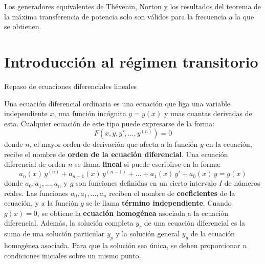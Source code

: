 \documentclass[11pt]{book} %
\makeatletter
\numberwithin{dummy}{section}
\theoremstyle{ocrenumbox}
\theoremstyle{blacknumex}
\theoremstyle{blacknumbox}
\theoremstyle{ocrenum}
\newenvironment{remark}{\par\vspace{10pt}\small %
\begin{list}{}{
\leftmargin=35pt %
\rightmargin=25pt}\item\ignorespaces %
\makebox[-2.5pt]{\begin{tikzpicture}[overlay]
\node[draw=ocre!60,line width=1pt,circle,fill=ocre!25,font=\sffamily\bfseries,inner sep=2pt,outer sep=0pt] at (-15pt,0pt){\textcolor{ocre}{N}};\end{tikzpicture}} %
\advance\baselineskip -1pt}{\end{list}\vskip5pt} %
\renewcommand{\section}{\@startsection{section}{1}{\z@}
{-4ex \@plus -1ex \@minus -.4ex}
{1ex \@plus.2ex }
{\normalfont\large\sffamily\bfseries}}
\newlength\esp
\newcommand{\thechapterimage}{}%
\newcommand{\chapterimage}[1]{\renewcommand{\thechapterimage}{#1}}%
\makeatother
\begin{document}
\begin{remark}
    Los generadores equivalentes de Thévenin, Norton y los resultados del teorema de la máxima transferencia de potencia solo son válidos para la frecuencia a la que se obtienen.
\end{remark}


	
	
	\chapterimage{imagen_t5.png} %
	\chapter{Introducción al régimen transitorio}
	
	\setcounter{section}{-1}
	\section{Repaso de ecuaciones diferenciales lineales}
	
	Una ecuación diferencial ordinaria es una ecuación que liga una variable independiente $x$, una función incógnita $y=y(x)$ y unas cuantas derivadas de esta. Cualquier ecuación de este tipo puede expresarse de la forma:
	\begin{equation*}
	    F(x, y, y', ..., y^{(n)})=0
	\end{equation*}
	donde $n$, el mayor orden de derivación que afecta a la función $y$ en la ecuación, recibe el nombre de \textbf{orden de la ecuación diferencial}. Una ecuación diferencial de orden $n$ se llama \textbf{lineal} si puede escribirse en la forma: 
	\begin{equation*}
	    a_n(x)\,y^{(n)}+a_{n-1}(x)\,y^{(n-1)}+...+a_{1}(x)\,y'+a_0(x)\,y=g(x)
	\end{equation*}
	donde $a_0,a_1,...,a_n$ y $g$ son funciones definidas en un cierto intervalo $I$ de números reales. Las funciones $a_0,a_1,...,a_n$ reciben el nombre de \textbf{coeficientes} de la ecuación, y a la función $g$ se le llama \textbf{término independiente}. Cuando $g(x)=0$, se obtiene la \textbf{ecuación homogénea} asociada a la ecuación diferencial. Además, la solución completa $y_c$ de una ecuación diferencial es la suma de una solución particular $y_p$ y la solución general $y_g$ de la ecuación homogénea asociada. Para que la solución sea única, se deben proporcionar $n$ condiciones iniciales sobre un mismo punto. 
	
\end{document}

